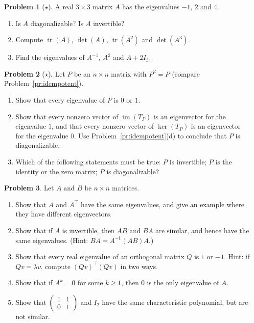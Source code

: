 \documentclass[11pt]{article}
\theoremstyle{definition}
\newtheorem{problem}{Problem}[section]
\DeclareMathOperator{\im}{im}
\DeclareMathOperator{\tr}{tr}
\begin{document}
\begin{problem}[$\star$]\label{pr:eig-gre}
    A real $3 \times 3$ matrix $A$ has the eigenvalues $-1$, $2$ and $4$.
    \begin{enumerate}[label=(\alph*)]
        \item Is $A$ diagonalizable? Is $A$ invertible?
        \item Compute $\tr(A)$, $\det(A)$, $\tr(A^2)$ and $\det(A^3)$.
        \item Find the eigenvalues of $A^{-1}$, $A^2$ and $A + 2I_3$.
    \end{enumerate}
\end{problem}

\begin{problem}[$\star$]\label{pr:eig-idempotent}
    Let $P$ be an $n \times n$ matrix with $P^2 = P$ (compare Problem~\ref{pr:idempotent}).
    \begin{enumerate}[label=(\alph*)]
        \item Show that every eigenvalue of $P$ is $0$ or $1$.
        \item Show that every nonzero vector of $\im(T_P)$ is an eigenvector for the eigenvalue $1$, and that every nonzero vector of $\ker(T_P)$ is an eigenvector for the eigenvalue $0$. Use Problem~\ref{pr:idempotent}(d) to conclude that $P$ is diagonalizable.
        \item Which of the following statements must be true: $P$ is invertible; $P$ is the identity or the zero matrix; $P$ is diagonalizable?
    \end{enumerate}
\end{problem}

\begin{problem}\label{pr:eig-props}
    Let $A$ and $B$ be $n \times n$ matrices.
    \begin{enumerate}[label=(\alph*)]
        \item Show that $A$ and $A^\top$ have the same eigenvalues, and give an example where they have different eigenvectors.
        \item Show that if $A$ is invertible, then $AB$ and $BA$ are similar, and hence have the same eigenvalues. (Hint: $BA = A^{-1}(AB)A$.)
        \item Show that every real eigenvalue of an orthogonal matrix $Q$ is $1$ or $-1$. Hint: if $Qv = \lambda v$, compute $(Qv)^\top (Qv)$ in two ways.
        \item Show that if $A^k = 0$ for some $k \geq 1$, then $0$ is the only eigenvalue of $A$.
        \item Show that $\begin{pmatrix} 1 & 1 \\ 0 & 1 \end{pmatrix}$ and $I_2$ have the same characteristic polynomial, but are not similar.
    \end{enumerate}
\end{problem}
\end{document}
